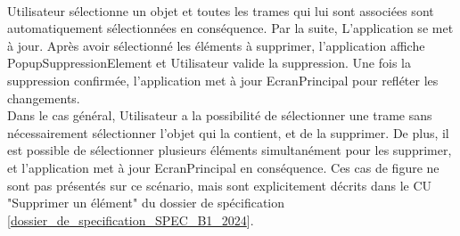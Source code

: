 \\
Utilisateur sélectionne un objet et toutes les trames qui lui sont associées sont automatiquement sélectionnées en conséquence. Par la suite, L'application {\nomApplication} se met à jour. Après avoir sélectionné les éléments à supprimer, l'application {\nomApplication} affiche PopupSuppressionElement et Utilisateur valide la suppression. Une fois la suppression confirmée, l'application {\nomApplication} met à jour EcranPrincipal pour refléter les changements.\\

Dans le cas général, Utilisateur a la possibilité de sélectionner une trame sans nécessairement sélectionner l'objet qui la contient, et de la supprimer. De plus, il est possible de sélectionner plusieurs éléments simultanément pour les supprimer, et l'application {\nomApplication} met à jour EcranPrincipal en conséquence. Ces cas de figure ne sont pas présentés sur ce scénario, mais sont explicitement décrits dans le CU "Supprimer un élément" du dossier de spécification [\hyperref[SPEC]{dossier\_de\_specification\_SPEC\_B1\_2024}]. 